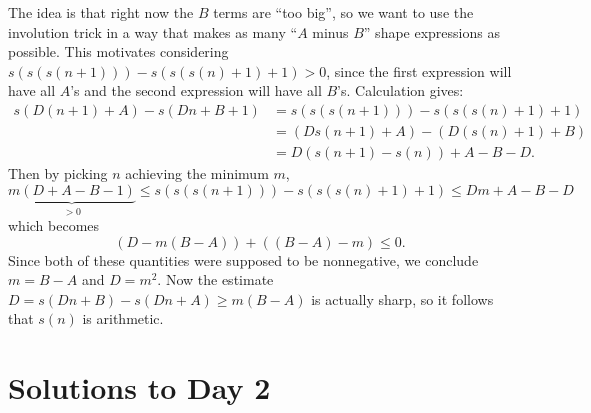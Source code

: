 The idea is that right now the $B$ terms are ``too big'',
so we want to use the involution trick in a way that makes as many
``$A$ minus $B$'' shape expressions as possible.
This motivates considering $s(s(s(n+1))) - s(s(s(n)+1)+1) > 0$,
since the first expression will have all $A$'s
and the second expression will have all $B$'s.
Calculation gives:
\begin{align*}
  s(D(n+1)+A) - s(Dn+B+1)
  &= \boxed{s(s(s(n+1))) - s(s(s(n)+1)+1)} \\
  &= (Ds(n+1) + A) - (D(s(n)+1) + B) \\
  &= D\left( s(n+1)-s(n) \right) + A-B-D.
\end{align*}
Then by picking $n$ achieving the minimum $m$,
\[ \underbrace{m(D+A-B-1)}_{>0} \le s(s(s(n+1))) - s(s(s(n)+1)+1) \le Dm + A-B-D \]
which becomes
\[ \left( D-m(B-A) \right) + \left( (B-A)-m \right) \le 0. \]
Since both of these quantities were supposed to be nonnegative,
we conclude $m = B-A$ and $D = m^2$.
Now the estimate $D = s(Dn+B) - s(Dn+A) \ge m(B-A)$ is actually sharp,
so it follows that $s(n)$ is arithmetic.
\pagebreak

\section{Solutions to Day 2}